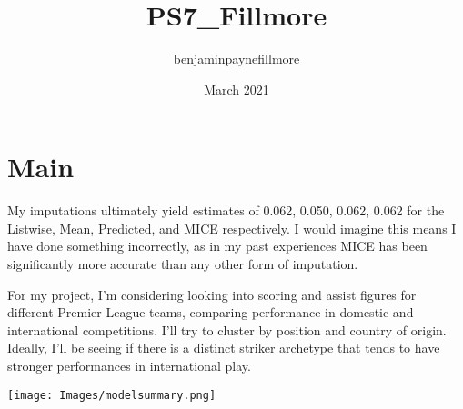 \documentclass{article}
\title{PS7_Fillmore}
\author{benjaminpaynefillmore }
\date{March 2021}
\begin{document}
\graphicspath{ {./images/} }
\maketitle

\section{Main}
My imputations ultimately yield estimates of 0.062, 0.050,	0.062,	0.062 for the Listwise, Mean, Predicted, and MICE respectively. I would imagine this means I have done something incorrectly, as in my past experiences MICE has been significantly more accurate than any other form of imputation. 

For my project, I'm considering looking into scoring and assist figures for different Premier League teams, comparing performance in domestic and international competitions. I'll try to cluster by position and country of origin. Ideally, I'll be seeing if there is a distinct striker archetype that tends to have stronger performances in international play.


\texttt{[image: Images/modelsummary.png]}
\end{document}
